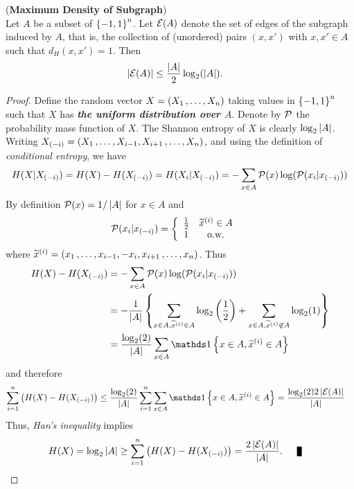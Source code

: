\documentclass[11pt]{article}
\begin{document}
\begin{itemize}
\begin{theorem} (\textbf{Maximum Density of Subgraph}) \citep{boucheron2013concentration}\\
Let $A$ be a subset of $\left\{-1, 1\right\}^n$. Let ${\mathcal E}(A)$ denote the set of edges of the subgraph induced by $A$, that is, the collection of (unordered) pairs $(x, x')$ with $x, x' \in A$ such that $d_H(x, x') = 1$. Then
\begin{align}
\left\lvert {\mathcal E}(A) \right\rvert &\le \frac{\left\lvert A \right\rvert}{2} \log_2(\left\lvert A \right\rvert). \label{ineqn: max_density_subgraph}
\end{align}
\end{theorem}
\begin{proof}
Define the random vector $X = (X_1 \,{,}\ldots{,}\, X_n)$ taking values in $\left\{-1, 1\right\}^n$  such that $X$ has \emph{\textbf{the uniform distribution over $A$}}. Denote by ${\mathcal P}$ the probability mass function of $X$. The Shannon entropy of $X$ is clearly $\log_{2}\left\lvert A \right\rvert$.  Writing $X_{(-i)} = (X_1 \,{,}\ldots{,}\, X_{i-1}, X_{i+1} \,{,}\ldots{,}\, X_{n})$, and using the definition of \emph{conditional entropy}, we have
\begin{align*}
H(X | X_{(-i)}) = H(X) - H(X_{(-i)}) = H(X_i | X_{(-i)}) = - \sum_{x\in A} {\mathcal P}(x) \log({\mathcal P}(x_i | x_{(-i)})) 
\end{align*} By definition ${\mathcal P}(x) =1/\left\lvert A \right\rvert$ for $x \in A$ and 
\begin{align*}
{\mathcal P}(x_i | x_{(-i)}) &= \left\{ \begin{array}{cc}
\frac{1}{2} & \widetilde{x}^{(i)}  \in A \\
1 & \text{o.w.}
\end{array}
\right.
\end{align*} where $\widetilde{x}^{(i)} = (x_1 \,{,}\ldots{,}\, x_{i-1}, -x_i,  x_{i+1} \,{,}\ldots{,}\, x_{n})$. Thus
\begin{align*}
H(X) - H(X_{(-i)}) &=  - \sum_{x\in A} \cP(x) \log(\cP(x_i | x_{(-i)})) \\
 &= - \frac{1}{\abs{A}}\set{ \sum_{x\in A, \widetilde{x}^{(i)}  \in A} \log_2\paren{\frac{1}{2}} + \sum_{x\in A, \widetilde{x}^{(i)}  \not\in A} \log_2(1)}\\
 &= \frac{\log_2(2)}{\abs{A}} \sum_{x \in A}\ind{x\in A, \widetilde{x}^{(i)}  \in A}
\end{align*} and therefore
\begin{align*}
\sum_{i=1}^{n}\paren{H(X) - H(X_{(-i)})} &\le \frac{\log_2(2)}{\abs{A}} \sum_{i=1}^{n}\sum_{x \in A}\ind{x\in A, \widetilde{x}^{(i)}  \in A} = \frac{\log_2(2) 2 \abs{\cE(A)}}{\abs{A}}
\end{align*} Thus, \emph{Han's inequality} implies
\begin{align*}
H(X) = \log_{2}\abs{A} &\ge \sum_{i=1}^{n}\paren{H(X) - H(X_{(-i)})} =  \frac{2 \abs{\cE(A)}}{\abs{A}}. \qed
\end{align*}
\end{proof}


\end{itemize}
\end{document}
